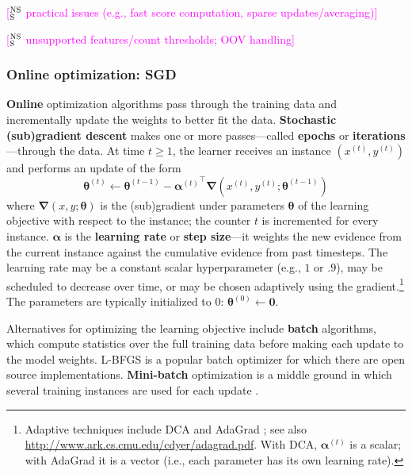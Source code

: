 \documentclass[11pt,letterpaper]{article}
\newcommand{\ensuretext}[1]{#1}
\newcommand{\nssmarker}{\ensuretext{\textcolor{magenta}{\ensuremath{^{\textsc{NS}}_{\textsc{S}}}}}}
\newcommand{\arkcomment}[3]{\ensuretext{\textcolor{#3}{[#1 #2]}}}
\newcommand{\nss}[1]{\arkcomment{\nssmarker}{#1}{magenta}}
\begin{document}
\nss{practical issues (e.g., fast score computation, sparse updates/averaging)}

\nss{unsupported features/count thresholds; OOV handling}

\subsubsection{Online optimization: SGD}\label{sec:online}

\textbf{Online} optimization algorithms pass through the training data and incrementally update 
the weights to better fit the data.
\textbf{Stochastic (sub)gradient descent} \citep[SGD;][]{sgd} makes one or more passes---called \textbf{epochs} or \textbf{iterations}---through the data. 
At time $t \geq 1$, the learner receives an instance $(x^{(t)},y^{(t)})$ and performs an update of the form
\begin{equation}\label{eq:sgd}
\boldsymbol{\theta}^{(t)} \leftarrow \boldsymbol{\theta}^{(t-1)} - {\boldsymbol{\alpha}^{(t)}}^{\top} \boldsymbol{\nabla}(x^{(t)},y^{(t)};\boldsymbol{\theta}^{(t-1)})
\end{equation}
where $\boldsymbol{\nabla}(x,y; \boldsymbol{\theta})$ is the (sub)gradient under parameters $\boldsymbol{\theta}$ 
of the learning objective with respect to the instance; the counter $t$ is incremented for every instance.
$\boldsymbol{\alpha}$ is the \textbf{learning rate} or \textbf{step size}---it weights the new evidence 
from the current instance against the cumulative evidence from past timesteps.
The learning rate may be a constant scalar hyperparameter (e.g., $1$ or $.9$), may be scheduled to decrease over time, 
or may be chosen adaptively using the gradient.\footnote{\label{fn:adaptive}Adaptive techniques include DCA \citep{martins-10} 
and AdaGrad \citep{adagrad}; see also \url{http://www.ark.cs.cmu.edu/cdyer/adagrad.pdf}.
With DCA, $\boldsymbol{\alpha}^{(t)}$ is a scalar; with AdaGrad it is a vector (i.e., each parameter has its own learning rate).}
The parameters are typically initialized to 0: $\boldsymbol{\theta}^{(0)} \leftarrow \mathbf{0}$.

Alternatives for optimizing the learning objective include 
\textbf{batch} algorithms, which compute statistics over the full training data 
before making each update to the model weights. 
L-BFGS \citep{lbfgs} is a popular batch optimizer for which there are open source implementations.
\textbf{Mini-batch} optimization is a middle ground in which several training instances 
are used for each update \citep[p.~175]{smith}.
\end{document}
